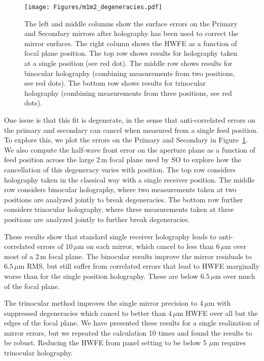 \begin{figure}[t!]
    \centering
    \texttt{[image: Figures/m1m2\_degeneracies.pdf]}
    \caption{The left and middle columns show the surface errors on the Primary and Secondary mirrors after holography has been used to correct the mirror surfaces.  The right column shows the HWFE as a function of focal plane position.  The top row shows results for holography taken at a single position (see red dot).  The middle row shows results for binocular holography (combining measurements from two positions, see red dots).  The bottom row shows results for trinocular holography (combining measurements from three positions, see red dots).}
    \label{fig:m1m2_errs}
\end{figure}

One issue is that this fit is degenerate, in the sense that anti-correlated errors on the primary and secondary can cancel when measured from a single feed position.  To explore this, we plot the errors on the Primary and Secondary in Figure~\ref{fig:m1m2_errs}.  We also compute the half-wave front error on the aperture plane as a function of feed position across the large 2\,m focal plane used by SO to explore how the cancellation of this degeneracy varies with position.  The top row considers holography taken in the classical way with a single receiver position.  The middle row considers binocular holography, where two measurements taken at two positions are analyzed jointly to break degeneracies.  The bottom row further considers trinocular holography, where three measurements taken at three positions are analyzed jointly to further break degeneracies. 

These results show that standard single receiver holography leads to anti-correlated errors of $10\,\mu$m on each mirror, which cancel to less than $6\,\mu$m over most of a 2\,m focal plane.  The binocular results improve the mirror residuals to $6.5 \,\mu$m RMS, but still suffer from correlated errors that lead to HWFE marginally worse than for the single position holography.  These are below  $6.5\,\mu$m over much of the focal plane.  

The trinocular method improves the single mirror precision to $4\,\mu$m with suppressed degeneracies  which cancel  to better than $4\,\mu$m HWFE over all but the edges of the focal plane.   We have presented these results for a single realization of mirror errors, but we repeated the calculation 10 times and found the results to be robust.  Reducing the HWFE from panel setting to be below 5 $\mu$m requires trinocular holography.


